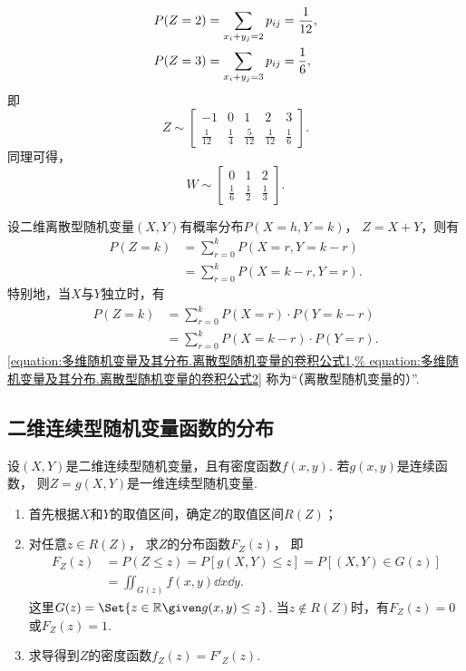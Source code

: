 \begin{example}
\begin{solution}
\begin{align*}
	&P(Z=2) = \sp{2} = \frac{1}{12}, \\
	&P(Z=3) = \sp{3} = \frac{1}{6},
\end{align*}
即\[
	Z \sim \begin{bmatrix}
		-1 & 0 & 1 & 2 & 3 \\
		\frac{1}{12} & \frac{1}{4} & \frac{5}{12} & \frac{1}{12} & \frac{1}{6}
	\end{bmatrix}.
\]
同理可得，\[
	W \sim \begin{bmatrix}
		0 & 1 & 2 \\
		\frac{1}{6} & \frac{1}{2} & \frac{1}{3}
	\end{bmatrix}.
\]
\end{solution}
\end{example}

\begin{theorem}\label{theorem:多维随机变量及其分布.离散型随机变量的卷积公式}
设二维离散型随机变量\((X,Y)\)有概率分布\(P(X=h,Y=k)\)，
\(Z=X+Y\)，则有\begin{align}
	P(Z=k)
	&= \sum_{r=0}^k P(X=r,Y=k-r) \\
	&= \sum_{r=0}^k P(X=k-r,Y=r).
\end{align}
特别地，当\(X\)与\(Y\)独立时，有\begin{align}
	P(Z=k)
	&= \sum_{r=0}^k P(X=r) \cdot P(Y=k-r) \label{equation:多维随机变量及其分布.离散型随机变量的卷积公式1} \\
	&= \sum_{r=0}^k P(X=k-r) \cdot P(Y=r). \label{equation:多维随机变量及其分布.离散型随机变量的卷积公式2}
\end{align}
\rm\cref{equation:多维随机变量及其分布.离散型随机变量的卷积公式1,%
equation:多维随机变量及其分布.离散型随机变量的卷积公式2}
称为“（离散型随机变量的）”.
\end{theorem}

\subsection{二维连续型随机变量函数的分布}
设\((X,Y)\)是二维连续型随机变量，且有密度函数\(f(x,y)\).
若\(g(x,y)\)是连续函数，
则\(Z = g(X,Y)\)是一维连续型随机变量.
\begin{enumerate}
	\item 首先根据\(X\)和\(Y\)的取值区间，确定\(Z\)的取值区间\(R(Z)\)；

	\item 对任意\(z \in R(Z)\)，
	求\(Z\)的分布函数\(F_Z(z)\)，
	即\begin{align*}
		F_Z(z) &= P(Z \leq z)
		= P[g(X,Y) \leq z]
		= P[(X,Y) \in G(z)] \\
		&= \iint_{G(z)} f(x,y) \dd{x}\dd{y}.
	\end{align*}
	这里\(G(z) = \Set{ z\in\mathbb{R} \given g(x,y) \leq z }\).
	当\(z \notin R(Z)\)时，有\(F_Z(z)=0\)或\(F_Z(z)=1\).

	\item 求导得到\(Z\)的密度函数\(f_Z(z) = F'_Z(z)\).
\end{enumerate}


